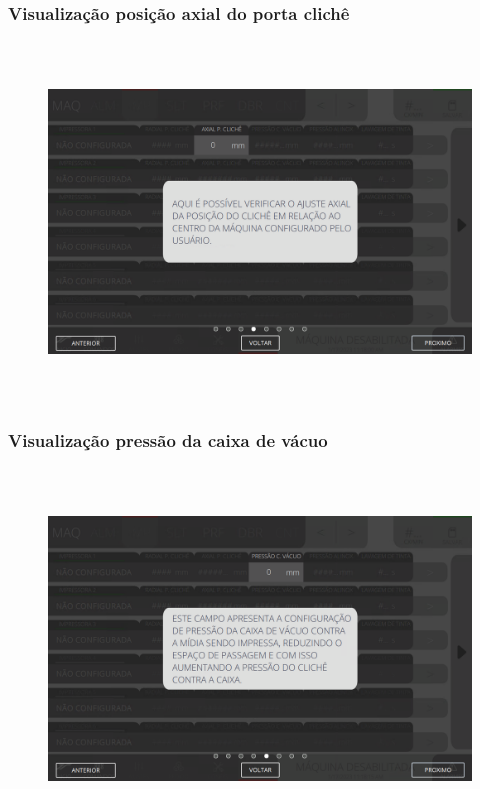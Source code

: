 \newpage
\thispagestyle{fancy}
\vspace*{40 pt}
\subsubsection{\small{Visualização posição axial do porta clichê}}\label{telaAjustesImpressorasVisualizacaoPosicaoAxialDoPortaCliche}
\vspace*{\fill}
\begin{figure}[h]
  \centering
  \includegraphics[width=576px,height=360px]{src/imagesFlexo/04-printter/01-printters/settings/e-4.png}
\end{figure}
\vspace*{\fill}

\newpage
\thispagestyle{fancy}
\vspace*{40 pt}
\subsubsection{\small{Visualização pressão da caixa de vácuo}}\label{telaAjustesImpressorasVisualizacaoPressaoDaCaixaDeVacio}
\vspace*{\fill}
\begin{figure}[h]
  \centering
  \includegraphics[width=576px,height=360px]{src/imagesFlexo/04-printter/01-printters/settings/e-5.png}
\end{figure}
\vspace*{\fill}

